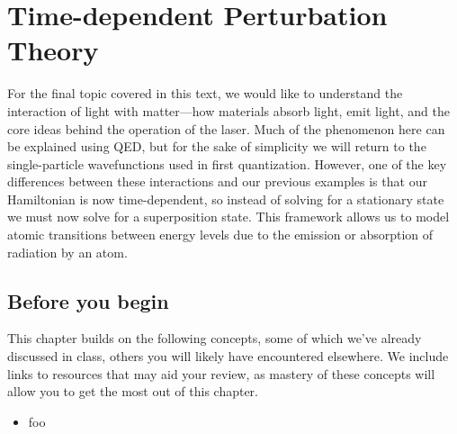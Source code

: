

%

\chapter[Perturbation Theory]{Time-dependent Perturbation Theory} \label{ch:pert}
For the final topic covered in this text, we would like to understand the interaction of light with matter---how materials absorb light, emit light, and the core ideas behind the operation of the laser. 
Much of the phenomenon here can be explained using QED, but for the sake of simplicity we will return to the single-particle wavefunctions used in first quantization. 
However, one of the key differences between these interactions and our previous examples is that our Hamiltonian is now time-dependent, so instead of solving for a stationary state we must now solve for a superposition state. 
This framework allows us to model atomic transitions between energy levels due to the emission or absorption of radiation by an atom.


\section{Before you begin}

This chapter builds on the following concepts, some of which we've already discussed in class, others you will likely have encountered elsewhere.
We include links to resources that may aid your review, as mastery of these concepts will allow you to get the most out of this chapter.

\begin{itemize}
	\item foo
\end{itemize}

